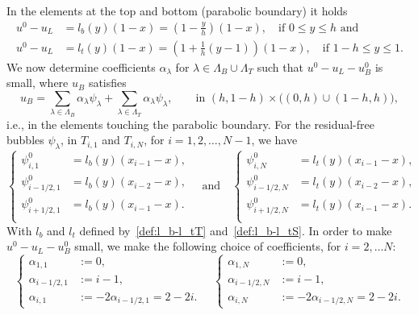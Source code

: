 \documentclass{article}
\newcommand{\summLA}[1][{}]{\ensuremath{\sum_{\lambda\in\Lambda_{#1}}\alpha_\lambda}}
\begin{document}
In the elements at the top and bottom (parabolic boundary) it holds
$$
\begin{aligned}
u^0 - u_L &= l_b(y)(1-x) = (1- \frac{y}{h})(1-x),\quad\text{if } 0\leq y \leq h \text{ and } \\
u^0 - u_L &= l_t(y)(1-x) = (1 + \frac{1}{h}(y-1))(1-x),\quad\text{if } 1-h \leq y \leq 1.
\end{aligned}
$$
We now determine coefficients $\alpha_\lambda$ for $\lambda\in\Lambda_B\cup\Lambda_T$ such that
$
u^0 - u_L- u_B^0
$
is small, where $u_B$ satisfies
\begin{equation}\label{Eq:psiI}
u_B = \summLA[B] \psi_\lambda + \summLA[T] \psi_\lambda, 
\qquad\text{in } (h,1-h)\times\big((0,h)\cup (1-h,h)\big),
\end{equation}
i.e., in the elements touching the parabolic boundary.
For the residual-free bubbles $\psi_\lambda$,
 in $T_{i,1}$ and $T_{i,N}$, for $i=1,2,\dots,N-1$, we have
\begin{equation}\label{Eq:psi}
    \left\{
\begin{aligned}
     \psi^0_{i,1}        &= l_b(y)(x_{i-1}-x), \\
        \psi^0_{i-1/2,1} &= l_b(y)(x_{i-2}-x),\\
        \psi^0_{i+1/2,1} &= l_b(y)(x_{i-1}-x).\\
\end{aligned}
    \right.
    \quad\text{and}\quad
    \left\{
\begin{aligned}
        \psi^0_{i,N}     &= l_t(y)(x_{i-1}-x), \\
        \psi^0_{i-1/2,N} &= l_t(y)(x_{i-2}-x),\\
        \psi^0_{i+1/2,N} &= l_t(y)(x_{i-1}-x).\\
\end{aligned}
    \right.
\end{equation} 
With $l_b$ and $l_t$ defined by~\eqref{def:l_b-l_tT} and~\eqref{def:l_b-l_tS}.
In order to make $u^0 - u_L - u_B^0$ small, we make the following choice of coefficients, for $i=2,\dots N$:
\begin{equation}\label{Eq:coefficients}
    \left\{
\begin{aligned}
        \alpha_{1,1} &:=0, \\
        \alpha_{i-1/2,1} &:= i-1, \\
        \alpha_{i,1}  &:= -2\alpha_{i-1/2,1} = 2 -2 i.
\end{aligned}
    \right.\quad
    \left\{
\begin{aligned}
        \alpha_{1,N} &:=0, \\
        \alpha_{i-1/2,N} &:= i-1, \\
        \alpha_{i,N}  &:= -2\alpha_{i-1/2,N} = 2 -2 i.
\end{aligned}
    \right.
\end{equation}
\end{document}
